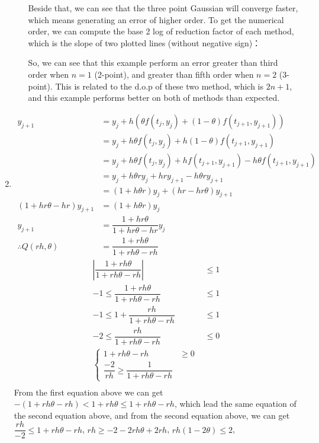 \documentclass{article}
\begin{document}
\begin{enumerate}
\begin{enumerate}
 Beside that, we can see that the three point Gaussian will converge faster, which means generating an error of higher order. To get the numerical order, we can compute the base 2 log of reduction factor of each method, which is the slope of two plotted lines (without negative sign)：\begin{small}
 
 \end{small}
 So, we can see that this example perform an error greater than third order when $n=1$ (2-point), and greater than fifth order when $n=2$ (3-point). This is related to the d.o.p of these two method, which is  $2n+1$, and this example performs better on both of methods than expected.
\end{enumerate}


\item
\begin{align*}
y_{j+1}&=y_j+h\left(\theta f(t_j,y_j)+(1-\theta) f(t_{j+1},y_{j+1})\right)\\
&=y_j+h\theta f(t_j,y_j)+h(1-\theta) f(t_{j+1},y_{j+1})\\
&=y_j+h\theta f(t_j,y_j)+hf(t_{j+1},y_{j+1})-h\theta f(t_{j+1},y_{j+1})\\
&=y_j+h\theta ry_j+hry_{j+1}-h\theta ry_{j+1}\\
&=(1+h\theta r)y_j +(hr-hr\theta) y_{j+1}\\
(1+hr\theta-hr) y_{j+1}&=(1+h\theta r)y_j\\
y_{j+1}&=\dfrac{1+hr\theta}{1+hr\theta-hr}y_j\\
\therefore Q(rh,\theta)&= \dfrac{1+rh\theta}{1+rh\theta-rh}
\end{align*} \begin{align*}
\left|\dfrac{1+rh\theta}{1+rh\theta-rh}\right| &\leq 1\\
-1\leq \dfrac{1+rh\theta}{1+rh\theta-rh}&\leq 1\\
-1\leq 1 +\dfrac{rh}{1+rh\theta-rh}&\leq 1\\
-2\leq \dfrac{rh}{1+rh\theta-rh}&\leq 0\\
\begin{cases}
1+rh\theta-rh &\geq 0\\
\dfrac{-2}{rh}\geq \dfrac{1}{1+rh\theta-rh}
\end{cases}\\
\end{align*}
From the first equation above we can get $-(1+rh\theta-rh)<1+ rh\theta \leq 1+rh\theta-rh$, which lead the same equation of the second equation above, and from the second equation above, we can get $\dfrac{rh}{-2}\leq 1+rh\theta-rh$, $rh\geq -2-2rh\theta+2rh$, $rh(1-2\theta)\leq 2$, 


\end{enumerate}
\end{document}
